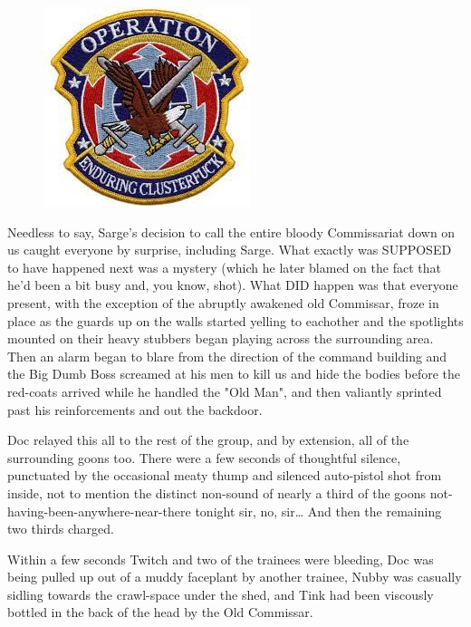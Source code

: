 \begin{figure}
	\begin{center}
		\includegraphics[width=\figwidth]{pics/21/52.png}
	\end{center}
\end{figure}
Needless to say, Sarge's decision to call the entire bloody Commissariat down on us caught everyone by surprise, including Sarge. 
What exactly was SUPPOSED to have happened next was a mystery (which he later blamed on the fact that he'd been a bit busy and, you know, shot). 
What DID happen was that everyone present, with the exception of the abruptly awakened old Commissar, froze in place as the guards up on the walls started yelling to eachother and the spotlights mounted on their heavy stubbers began playing across the surrounding area. 
Then an alarm began to blare from the direction of the command building and the Big Dumb Boss screamed at his men to kill us and hide the bodies before the red-coats arrived while he handled the "Old Man", and then valiantly sprinted past his reinforcements and out the backdoor.

Doc relayed this all to the rest of the group, and by extension, all of the surrounding goons too. 
There were a few seconds of thoughtful silence, punctuated by the occasional meaty thump and silenced auto-pistol shot from inside, not to mention the distinct non-sound of nearly a third of the goons not-having-been-anywhere-near-there tonight sir, no, sir… And then the remaining two thirds charged.

Within a few seconds Twitch and two of the trainees were bleeding, Doc was being pulled up out of a muddy faceplant by another trainee, Nubby was casually sidling towards the crawl-space under the shed, and Tink had been viscously bottled in the back of the head by the Old Commissar.

